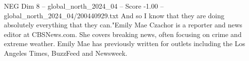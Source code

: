 \begin{textsample}{NEG Dim 8 – global\_north\_2024\_04 – Score -1.00 – global\_north\_2024\_04/200440929.txt}
And so I know that they are doing absolutely everything that they can."Emily Mae Czachor is a reporter and news editor at CBSNews.com.
She covers breaking news, often focusing on crime and extreme weather.
Emily Mae has previously written for outlets including the Los Angeles Times, BuzzFeed and Newsweek.

\end{textsample}
